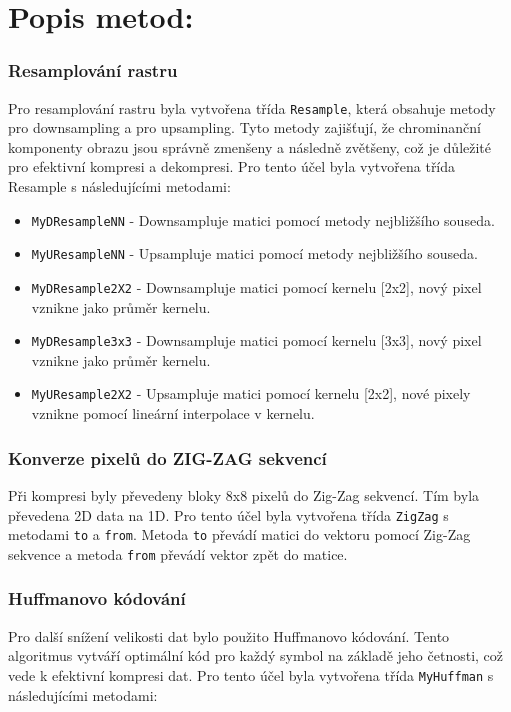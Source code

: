 \section*{Popis metod:}
\subsubsection*{Resamplování rastru}

Pro resamplování rastru byla vytvořena třída \texttt{Resample}, která obsahuje metody pro downsampling a pro upsampling. Tyto metody zajišťují, že chrominanční komponenty obrazu jsou správně zmenšeny a následně zvětšeny, což je důležité pro efektivní kompresi a dekompresi. Pro tento účel byla
vytvořena třída Resample s následujícími metodami:
\begin{itemize}
    \item \texttt{MyDResampleNN} - Downsampluje matici pomocí metody nejbližšího souseda.
    \item \texttt{MyUResampleNN}  - Upsampluje matici pomocí metody nejbližšího souseda.
    \item \texttt{MyDResample2X2} - Downsampluje matici pomocí kernelu [2x2], nový pixel vznikne jako průměr kernelu.
    \item \texttt{MyDResample3x3} - Downsampluje matici pomocí kernelu [3x3], nový pixel vznikne jako průměr kernelu.
    \item \texttt{MyUResample2X2} - Upsampluje matici pomocí kernelu [2x2], nové pixely vznikne pomocí lineární interpolace v kernelu.
\end{itemize}

\subsubsection*{Konverze pixelů do ZIG-ZAG sekvencí}

Při kompresi byly převedeny bloky 8x8 pixelů do Zig-Zag sekvencí. Tím byla převedena 2D data na 1D. Pro tento účel byla vytvořena třída \texttt{ZigZag} s metodami \texttt{to} a \texttt{from}. Metoda \texttt{to} převádí matici do vektoru pomocí Zig-Zag sekvence a metoda \texttt{from} převádí vektor zpět do matice.

\subsubsection*{Huffmanovo kódování}

Pro další snížení velikosti dat bylo použito Huffmanovo kódování. Tento algoritmus vytváří optimální kód pro každý symbol na základě jeho četnosti, což vede k efektivní kompresi dat. Pro tento účel byla vytvořena třída \texttt{MyHuffman} s následujícími metodami:

